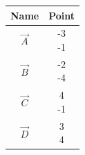 \begin{tabular}[12pt]{ |c| c|}
    \hline
    \textbf{Name} & \textbf{Point}\\ 
    \hline
	$\vec{A}$ & \myvec{-3\\-1}\\
    \hline 
	$\vec{B}$ & \myvec{-2\\-4}\\
    \hline
	$\vec{C}$ & \myvec{4\\-1}\\
    \hline
    $\vec{D}$ & \myvec{3\\4}\\
    \hline
    \end{tabular}